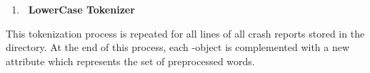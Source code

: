 \begin{enumerate}
\item \textbf{\toolname\ LowerCase Tokenizer} \\ \vspace{0.3em}
\end{enumerate}
This tokenization process is repeated for all lines of all crash reports stored in the directory. At the end of this process, each \Crash-object is complemented with a new attribute which represents the set of preprocessed words.

